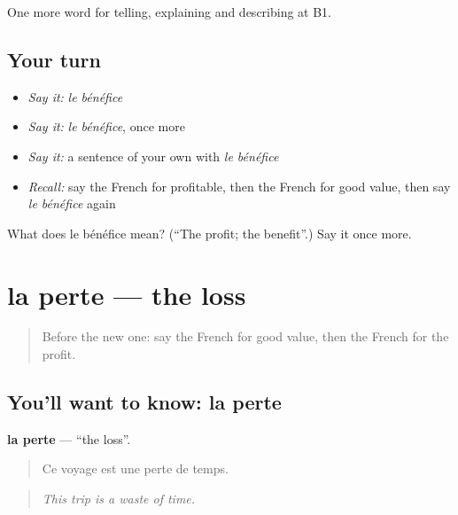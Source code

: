 \begin{grammarlens}[title={What you've built}]
One more word for telling, explaining and describing at B1.
\end{grammarlens}

\subsection*{Your turn}
\begin{itemize}
\raggedright
  \item \emph{Say it:} \emph{le bénéfice}
  \item \emph{Say it:} \emph{le bénéfice}, once more
  \item \emph{Say it:} a sentence of your own with \emph{le bénéfice}
  \item \emph{Recall:} say the French for profitable, then the French for good value, then say \emph{le bénéfice} again
\end{itemize}

\begin{tcolorbox}[breakable,colback=teal!4,colframe=teal!35!black,title={Before you move on}]
What does le bénéfice mean? (\textquotedblleft{}The profit; the benefit\textquotedblright{}.) Say it once more.
\end{tcolorbox}
\section[la perte]{la perte — the loss}

\label{lesson:FR-C394-perte}



\begin{quote}
Before the new one: say the French for good value, then the French for the profit.
\end{quote}

\subsection*{You'll want to know: la perte}
\textbf{la perte} — \textquotedblleft{}the loss\textquotedblright{}.

\begin{quote}
Ce voyage est une perte de temps.
\end{quote}

\begin{quote}
\emph{This trip is a waste of time.}
\end{quote}

